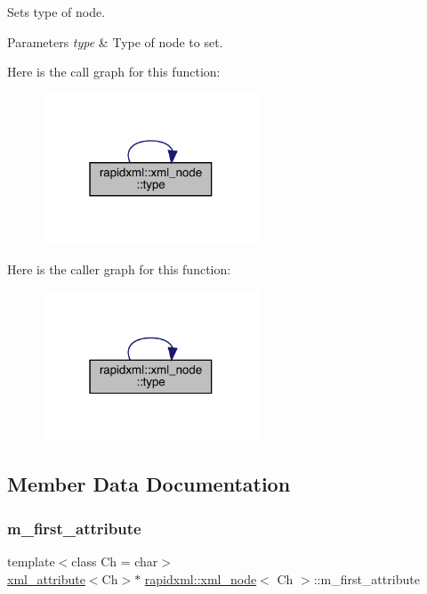 Sets type of node. 
\begin{DoxyParams}{Parameters}
{\em type} & Type of node to set. \\
\hline
\end{DoxyParams}
Here is the call graph for this function\+:\nopagebreak
\begin{figure}[H]
\begin{center}
\leavevmode
\includegraphics[width=183pt]{classrapidxml_1_1xml__node_a499bbc9300c1b06821d5c08b24164c68_cgraph}
\end{center}
\end{figure}
Here is the caller graph for this function\+:\nopagebreak
\begin{figure}[H]
\begin{center}
\leavevmode
\includegraphics[width=183pt]{classrapidxml_1_1xml__node_a499bbc9300c1b06821d5c08b24164c68_icgraph}
\end{center}
\end{figure}


\subsection{Member Data Documentation}
\mbox{\label{classrapidxml_1_1xml__node_a5f7caf8d72d8fae634be6eb744ad8538}} 
\subsubsection{\texorpdfstring{m\_first\_attribute}{m\_first\_attribute}}
{\footnotesize\ttfamily template$<$class Ch = char$>$ \\
\mbox{\hyperlink{classrapidxml_1_1xml__attribute}{xml\+\_\+attribute}}$<$Ch$>$$\ast$ \mbox{\hyperlink{classrapidxml_1_1xml__node}{rapidxml\+::xml\+\_\+node}}$<$ Ch $>$\+::m\+\_\+first\+\_\+attribute\hspace{0.3cm}{\ttfamily [private]}}

